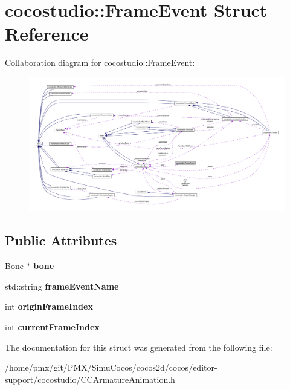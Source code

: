 \hypertarget{structcocostudio_1_1FrameEvent}{}\section{cocostudio\+:\+:Frame\+Event Struct Reference}
\label{structcocostudio_1_1FrameEvent}


Collaboration diagram for cocostudio\+:\+:Frame\+Event\+:
\nopagebreak
\begin{figure}[H]
\begin{center}
\leavevmode
\includegraphics[width=350pt]{structcocostudio_1_1FrameEvent__coll__graph}
\end{center}
\end{figure}
\subsection*{Public Attributes}
\begin{DoxyCompactItemize}
\item 
\mbox{\label{structcocostudio_1_1FrameEvent_a2b34f2b46aa25be99a598c3d4dd3a41b}} 
\hyperlink{classcocostudio_1_1Bone}{Bone} $\ast$ {\bfseries bone}
\item 
\mbox{\label{structcocostudio_1_1FrameEvent_a6de62995444e878168a2cc04ed3b5104}} 
std\+::string {\bfseries frame\+Event\+Name}
\item 
\mbox{\label{structcocostudio_1_1FrameEvent_a24a1ce7c4b78e37f3587dc99541aadf7}} 
int {\bfseries origin\+Frame\+Index}
\item 
\mbox{\label{structcocostudio_1_1FrameEvent_a53ee736dc0dfca61e642aa61d36d3213}} 
int {\bfseries current\+Frame\+Index}
\end{DoxyCompactItemize}


The documentation for this struct was generated from the following file\+:\begin{DoxyCompactItemize}
\item 
/home/pmx/git/\+P\+M\+X/\+Simu\+Cocos/cocos2d/cocos/editor-\/support/cocostudio/C\+C\+Armature\+Animation.\+h\end{DoxyCompactItemize}
